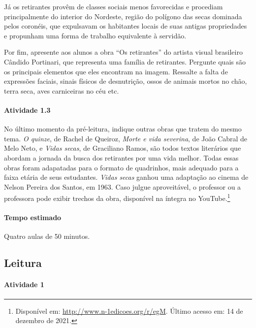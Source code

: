 \documentclass[11pt]{extarticle}
\begin{document}
Já os retirantes provêm de classes sociais menos favorecidas e procediam principalmente do interior do 
Nordeste, região do polígono das secas dominada pelos coronéis, que expulsavam os habitantes locais de suas antigas
propriedades e propunham uma forma de trabalho equivalente à servidão. 

Por fim, apresente aos alunos a obra ``Os retirantes'' do artista visual brasileiro Cândido Portinari,
que representa uma família de retirantes. Pergunte quais são os principais elementos que eles encontram
na imagem. Ressalte a falta de expressões faciais, sinais físicos de desnutrição, ossos de animais mortos
no chão, terra seca, aves carniceiras no céu etc.



\paragraph{Atividade 1.3}

No último momento da pré-leitura, indique outras obras que tratem do mesmo tema. 
\textit{O quinze}, de Rachel de Queiroz, \textit{Morte e vida severina}, de João Cabral de Melo Neto, 
e \textit{Vidas secas}, de Graciliano Ramos, são todos textos literários que abordam 
a jornada da busca dos retirantes por uma vida melhor. Todas essas obras foram adapatadas para o formato de quadrinhos, mais adequado para a faixa etária de seus estudantes. \textit{Vidas secas} ganhou uma adaptação ao cinema 
de Nelson Pereira dos Santos, em 1963. Caso julgue aproveitável, o professor ou a professora
pode exibir trechos da obra, disponível na íntegra no YouTube.\footnote{Disponível em: \url{http://www.n-1edicoes.org/r/egM}. Último acesso em: 14 de dezembro de 2021.}

\paragraph{Tempo estimado} Quatro aulas de 50 minutos. 

\subsection{Leitura}


\paragraph{Atividade 1}
\end{document}
